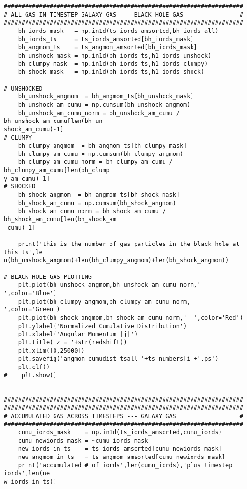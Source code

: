 \documentclass[12pt,headA,chapB]{fiskthesis}
\begin{document}
\begin{verbatim}
####################################################################
# ALL GAS IN TIMESTEP GALAXY GAS --- BLACK HOLE GAS                #
####################################################################
    bh_iords_mask   = np.in1d(ts_iords_amsorted,bh_iords_all)
    bh_iords_ts     = ts_iords_amsorted[bh_iords_mask]
    bh_angmom_ts    = ts_angmom_amsorted[bh_iords_mask]
    bh_unshock_mask = np.in1d(bh_iords_ts,h1_iords_unshock)
    bh_clumpy_mask  = np.in1d(bh_iords_ts,h1_iords_clumpy)
    bh_shock_mask   = np.in1d(bh_iords_ts,h1_iords_shock)
    
# UNSHOCKED
    bh_unshock_angmom  = bh_angmom_ts[bh_unshock_mask]
    bh_unshock_am_cumu = np.cumsum(bh_unshock_angmom)
    bh_unshock_am_cumu_norm = bh_unshock_am_cumu / bh_unshock_am_cumu[len(bh_un
shock_am_cumu)-1]
# CLUMPY
    bh_clumpy_angmom  = bh_angmom_ts[bh_clumpy_mask]
    bh_clumpy_am_cumu = np.cumsum(bh_clumpy_angmom)
    bh_clumpy_am_cumu_norm = bh_clumpy_am_cumu / bh_clumpy_am_cumu[len(bh_clump
y_am_cumu)-1]
# SHOCKED
    bh_shock_angmom  = bh_angmom_ts[bh_shock_mask]
    bh_shock_am_cumu = np.cumsum(bh_shock_angmom)
    bh_shock_am_cumu_norm = bh_shock_am_cumu / bh_shock_am_cumu[len(bh_shock_am
_cumu)-1]

    print('this is the number of gas particles in the black hole at this ts',le
n(bh_unshock_angmom)+len(bh_clumpy_angmom)+len(bh_shock_angmom))

# BLACK HOLE GAS PLOTTING
    plt.plot(bh_unshock_angmom,bh_unshock_am_cumu_norm,'--',color='Blue')
    plt.plot(bh_clumpy_angmom,bh_clumpy_am_cumu_norm,'--',color='Green')
    plt.plot(bh_shock_angmom,bh_shock_am_cumu_norm,'--',color='Red')
    plt.ylabel('Normalized Cumulative Distribution')
    plt.xlabel('Angular Momentum |j|')
    plt.title('z = '+str(redshift))
    plt.xlim([0,25000])
    plt.savefig('angmom_cumudist_tsall_'+ts_numbers[i]+'.ps')
    plt.clf()
#    plt.show()


####################################################################
####################################################################
# ACCUMULATED GAS ACROSS TIMESTEPS --- GALAXY GAS                  #
####################################################################
    cumu_iords_mask    = np.in1d(ts_iords_amsorted,cumu_iords)
    cumu_newiords_mask = ~cumu_iords_mask
    new_iords_in_ts    = ts_iords_amsorted[cumu_newiords_mask]
    new_angmom_in_ts   = ts_angmom_amsorted[cumu_newiords_mask]
    print('accumulated # of iords',len(cumu_iords),'plus timestep iords',len(ne
w_iords_in_ts))


\end{verbatim}
\end{document}

